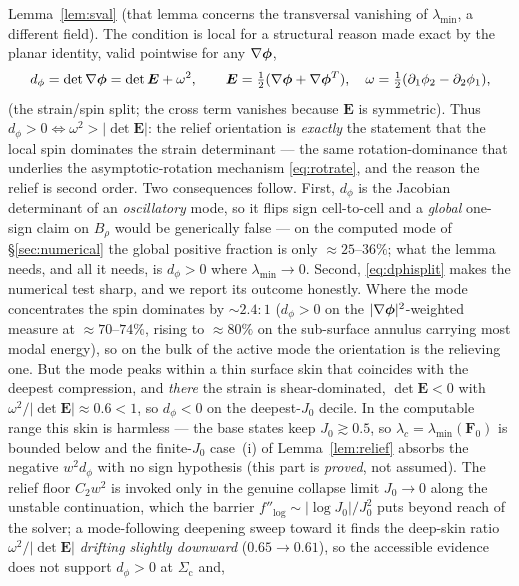 Lemma~\ref{lem:sval} (that lemma concerns the transversal vanishing of $\lambda_{\min}$, a different field). The
condition is local for a structural reason made exact by the planar identity, valid pointwise for any $\nabla\bm\phi$,
\begin{equation}
    \label{eq:dphisplit}
    d_\phi=\det\nabla\bm\phi=\det\bm E+\omega^2,\qquad
    \bm E=\tfrac12(\nabla\bm\phi+\nabla\bm\phi^{T}),\quad \omega=\tfrac12(\partial_1\phi_2-\partial_2\phi_1),
\end{equation}
(the strain/spin split; the cross term vanishes because $\bm E$ is symmetric). Thus $d_\phi>0\iff\omega^2>|\det\bm E|$:
the relief orientation is \emph{exactly} the statement that the local spin dominates the strain determinant --- the same
rotation-dominance that underlies the asymptotic-rotation mechanism \eqref{eq:rotrate}, and the reason the relief is
second order. Two consequences follow. First, $d_\phi$ is the Jacobian determinant of an \emph{oscillatory} mode, so it
flips sign cell-to-cell and a \emph{global} one-sign claim on $B_\rho$ would be generically false --- on the computed
mode of \S\ref{sec:numerical} the global positive fraction is only ${\approx}25$--$36\%$; what the lemma needs, and all
it needs, is $d_\phi>0$ where $\lambda_{\min}\to0$. Second, \eqref{eq:dphisplit} makes the numerical test sharp, and we
report its outcome honestly. Where the mode concentrates the spin dominates by ${\sim}2.4{:}1$ ($d_\phi>0$ on the
$|\nabla\bm\phi|^2$-weighted measure at ${\approx}70$--$74\%$, rising to ${\approx}80\%$ on the sub-surface annulus
carrying most modal energy), so on the bulk of the active mode the orientation is the relieving one. But the mode peaks
within a thin surface skin that coincides with the deepest compression, and \emph{there} the strain is shear-dominated,
$\det\bm E<0$ with $\omega^2/|\det\bm E|\approx0.6<1$, so $d_\phi<0$ on the deepest-$J_0$ decile. In the computable
range this skin is harmless --- the base states keep $J_0\gtrsim0.5$, so $\lambda_c=\lambda_{\min}(\bm F_0)$ is bounded
below and the finite-$J_0$ case~(i) of Lemma~\ref{lem:relief} absorbs the negative $w^2 d_\phi$ with no sign hypothesis
(this part is \emph{proved}, not assumed). The relief floor $C_2 w^2$ is invoked only in the genuine collapse limit
$J_0\to0$ along the unstable continuation, which the barrier $f''_{\log}\sim|\log J_0|/J_0^2$ puts beyond reach of the
solver; a mode-following deepening sweep toward it finds the deep-skin ratio $\omega^2/|\det\bm E|$ \emph{drifting
slightly downward} ($0.65\to0.61$), so the accessible evidence does not support $d_\phi>0$ at $\Sigma_{\mathrm{c}}$ and,
